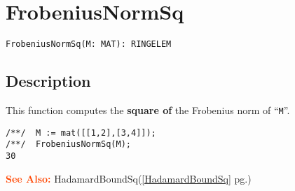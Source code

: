 \documentclass[a4paper]{mybook}
\newenvironment{command}{}{} %
\newcommand\SeeAlso{\par\textcolor{OrangeRed}{\textbf{\large See Also: }}}
\begin{document}
\section{FrobeniusNormSq}
\label{FrobeniusNormSq}
\begin{command} %


\begin{Verbatim}[label=syntax, rulecolor=\color{MidnightBlue},
frame=single]
FrobeniusNormSq(M: MAT): RINGELEM
\end{Verbatim}


\subsection*{Description}

This function computes the \textbf{square of} the Frobenius norm of ``\verb&M&''.
\begin{Verbatim}[label=example, rulecolor=\color{PineGreen}, frame=single]
/**/  M := mat([[1,2],[3,4]]);
/**/  FrobeniusNormSq(M);
30
\end{Verbatim}


\SeeAlso %
  HadamardBoundSq(\ref{HadamardBoundSq} pg.\pageref{HadamardBoundSq})
\end{command} %
\end{document}
